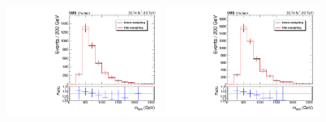 \begin{figure}[htbp]
  \includegraphics[width=0.45\textwidth]{figures/2018/Resolved_SR_Electron_WRCand_Mass.pdf}
  \hspace{0.01\textwidth}
  \includegraphics[width=0.45\textwidth]{figures/2018/Resolved_SR_Muon_WRCand_Mass.pdf}

  \label{fig:BkgdZptSRCompResolved}
\end{figure}

